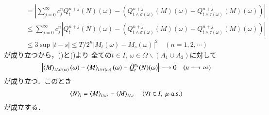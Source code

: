\begin{prf}
\begin{description}
\begin{align}
					&\qquad = \left| \sum_{j=0}^{\infty} c_j^n Q^{n+j}_t(N)(\omega) - \left( Q^{n+j}_{t\wedge\sigma(\omega)}(M)(\omega) - Q^{n+j}_{t\wedge\tau(\omega)}(M)(\omega) \right) \right| \\
					&\qquad \leq \sum_{j=0}^{\infty} c_j^n \left| Q^{n+j}_t(N)(\omega) - \left( Q^{n+j}_{t\wedge\sigma(\omega)}(M)(\omega) - Q^{n+j}_{t\wedge\tau(\omega)}(M)(\omega) \right) \right| \\
					&\qquad \leq 3 \sup{|t - s| \leq T/2^n}{|M_t(\omega) - M_s(\omega)|^2}
					\quad (n=1,2,\cdots)
				\end{align}
				が成り立つから，()と()より
				全ての$t \in I,\ \omega \in \Omega \backslash (A_1 \cup A_2)$に対して
				\begin{align}
					\left| \inprod<M>_{t\wedge\sigma(\omega)}(\omega) - \inprod<M>_{t\wedge\tau(\omega)}(\omega) - \hat{Q}^{n_k}_t(N)(\omega) \right|
					\longrightarrow 0 \quad (n \longrightarrow \infty)
				\end{align}
				が成り立つ．このとき
				\begin{align}
					\inprod<N>_t = \inprod<M>_{t\wedge\sigma} - \inprod<M>_{t\wedge\tau}
					\quad (\forall t \in I,\ \mbox{$\mu$-a.s.})
				\end{align}
				が成立する．
		\end{description}
	\end{prf}
